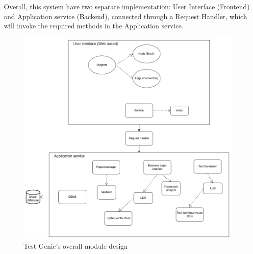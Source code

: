 \hspace{0.5cm}Overall, this system have two separate implementation: User Interface (Frontend) and Application service (Backend), connected through a Request Handler, which will invoke the required methods in the Application service. 
\begin{figure}[H]
	\centering
	\includegraphics[width=1.0\textwidth]{images/System design.drawio.png}
	\caption{Test Genie’s overall module design}
	\label{fig:system-design}
\end{figure}



